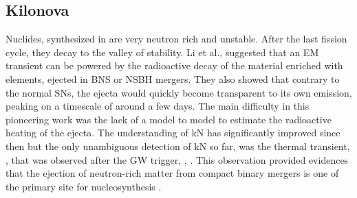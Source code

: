 

\subsection{Kilonova}

Nuclides, synthesized in \rproc{} are very neutron rich and unstable. After the last 
fission cycle, they decay to the valley of stability.%
%
%
%
Li et al., \citep{Li:1998bw} suggested that an \ac{EM} transient can be powered by 
the radioactive decay of the material enriched with \rproc{} elements, ejected in 
\ac{BNS} or \ac{NSBH} mergers. They also showed that contrary to the normal \acp{SN}, 
the ejecta would quickly become transparent to its own emission, peaking on a timescale 
of around a few days. The main difficulty in this pioneering work was the lack of a \nuc{}
 model to model to estimate the radioactive heating of the ejecta. 
%
The understanding of \ac{kN} has significantly improved since then
\citep[\eg][]{Kulkarni:2005jw,Metzger:2010,Roberts:2011,Metzger:2016pju,Wollaeger:2017ahm}
%
but the only unambiguous detection of \ac{kN} so far, was the thermal transient, \AT{}, 
\citep{Coulter:2017wya,Chornock:2017sdf,Nicholl:2017ahq,Cowperthwaite:2017dyu,Tanvir:2017pws,Tanaka:2017qxj}
that was observed after the \ac{GW} trigger, \GW{}, 
\citep{TheLIGOScientific:2017qsa,Abbott:2018wiz,LIGOScientific:2018mvr}.
%
This observation provided evidences that the ejection of neutron-rich matter from compact 
binary mergers is one of the primary site for \rproc{} nucleosynthesis 
\citep{Arcavi:2017xiz,Coulter:2017wya,Drout:2017ijr,Evans:2017mmy,Hallinan:2017woc,Kasliwal:2017ngb,
    Nicholl:2017ahq,Smartt:2017fuw,Soares-santos:2017lru,Tanvir:2017pws,
    Troja:2017nqp,Mooley:2018dlz,Ruan:2017bha,Lyman:2018qjg}. 
